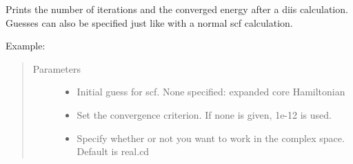 \documentclass[letterpaper,10pt,english]{sphinxmanual}
\begin{document}
\begin{fulllineitems}

\begin{fulllineitems}
\label{\detokenize{GHF:hf.HartreeFock.GHF.MF.get_scf_solution_diis}}
Prints the number of iterations and the converged energy after a diis calculation. Guesses can also be specified
just like with a normal scf calculation.

Example:

\begin{sphinxVerbatim}[commandchars=\\\{\}]
   
          
   
  
\end{sphinxVerbatim}
\begin{quote}\begin{description}
\item[{Parameters}] \leavevmode\begin{itemize}
\item {} 
 \textendash{} Initial guess for scf. None specified: expanded core Hamiltonian

\item {} 
 \textendash{} Set the convergence criterion. If none is given, 1e-12 is used.

\item {} 
 \textendash{} Specify whether or not you want to work in the complex space. Default is real.cd


\end{itemize}
\end{description}
\end{quote}
\end{fulllineitems}
\end{fulllineitems}
\end{document}
